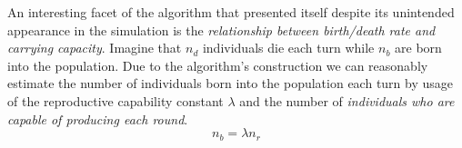 \documentclass{article}
\begin{document}
    \par An interesting facet of the algorithm that presented itself despite its unintended appearance in the simulation is the \emph{relationship between birth/death rate and carrying capacity}. Imagine that $n_d$ individuals die each turn while $n_b$ are born into the population. Due to the algorithm's construction we can reasonably estimate the number of individuals born into the population each turn by usage of the reproductive capability constant $\lambda$ and the number of \emph{individuals who are capable of producing each round}.
    \begin{equation}
        n_b = \lambda n_r
    \end{equation}
\end{document}
